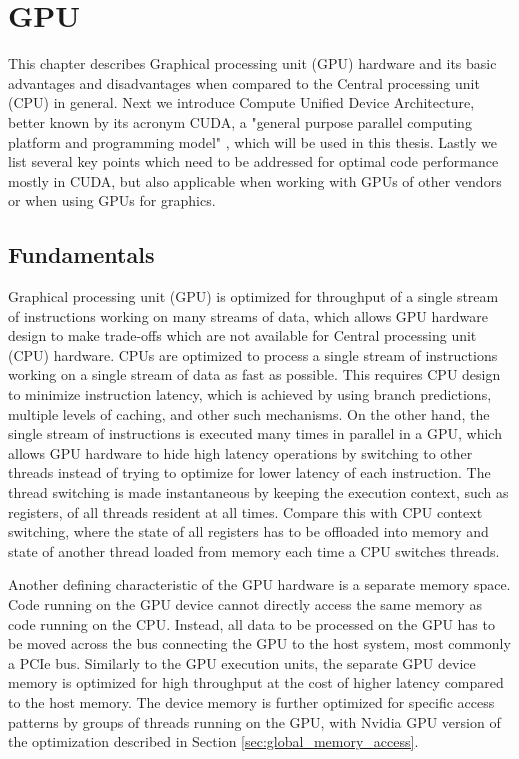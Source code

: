 \chapter{GPU}

This chapter describes Graphical processing unit (GPU) hardware and its basic advantages and disadvantages when compared to the Central processing unit (CPU) in general. Next we introduce Compute Unified Device Architecture, better known by its acronym CUDA, a "general purpose parallel computing platform and programming model" \citep{site:cuda}, which will be used in this thesis. Lastly we list several key points which need to be addressed for optimal code performance mostly in CUDA, but also applicable when working with GPUs of other vendors or when using GPUs for graphics.

\section{Fundamentals}
\label{sec:gpu}

Graphical processing unit (GPU) is optimized for throughput of a single stream of instructions working on many streams of data, which allows GPU hardware design to make trade-offs which are not available for Central processing unit (CPU) hardware.
CPUs are optimized to process a single stream of instructions working on a single stream of data as fast as possible. This requires CPU design to minimize instruction latency, which is achieved by using branch predictions, multiple levels of caching, and other such mechanisms. On the other hand, the single stream of instructions is executed many times in parallel in a GPU, which allows GPU hardware to hide high latency operations by switching to other threads instead of trying to optimize for lower latency of each instruction. The thread switching is made instantaneous by keeping the execution context, such as registers, of all threads resident at all times. Compare this with CPU context switching, where the state of all registers has to be offloaded into memory and state of another thread loaded from memory each time a CPU switches threads.

Another defining characteristic of the GPU hardware is a separate memory space. Code running on the GPU device cannot directly access the same memory as code running on the CPU. Instead, all data to be processed on the GPU has to be moved across the bus connecting the GPU to the host system, most commonly a PCIe bus. Similarly to the GPU execution units, the separate GPU device memory is optimized for high throughput at the cost of higher latency compared to the host memory. The device memory is further optimized for specific access patterns by groups of threads running on the GPU, with Nvidia GPU version of the optimization described in Section \ref{sec:global_memory_access}.
 
